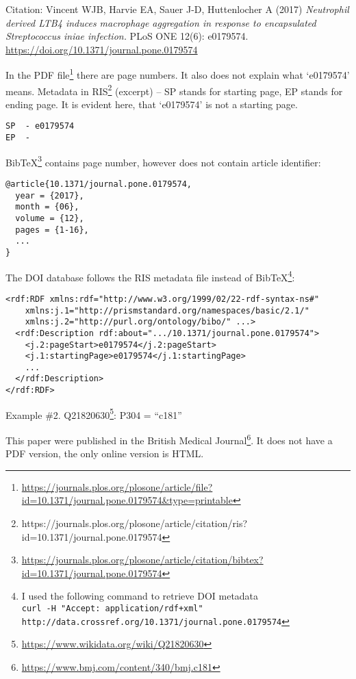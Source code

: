 Citation: Vincent WJB, Harvie EA, Sauer J-D, Huttenlocher A (2017) \emph{Neutrophil derived LTB4 induces macrophage aggregation in response to encapsulated Streptococcus iniae infection.} PLoS ONE 12(6): e0179574. \url{https://doi.org/10.1371/journal.pone.0179574}

In the PDF file\footnote{\url{https://journals.plos.org/plosone/article/file?id=10.1371/journal.pone.0179574&type=printable}} there are page numbers. It also does not explain what `e0179574' means. Metadata in RIS\footnote{https://journals.plos.org/plosone/article/citation/ris?id=10.1371/journal.pone.0179574} (excerpt) -- SP stands for starting page, EP stands for ending page. It is evident here, that `e0179574' is not a starting page. 
\begin{lstlisting}
SP  - e0179574
EP  - 
\end{lstlisting}

BibTeX\footnote{\url{https://journals.plos.org/plosone/article/citation/bibtex?id=10.1371/journal.pone.0179574}} contains page number, however does not contain article identifier:
\begin{lstlisting}
@article{10.1371/journal.pone.0179574,
  year = {2017},
  month = {06},
  volume = {12},
  pages = {1-16},
  ...
}
\end{lstlisting}

The DOI database follows the RIS metadata file instead of BibTeX\footnote{I used the following command to retrieve DOI metadata\\
\texttt{curl -H "Accept: application/rdf+xml" \\ http://data.crossref.org/10.1371/journal.pone.0179574}}:

\begin{lstlisting}
<rdf:RDF xmlns:rdf="http://www.w3.org/1999/02/22-rdf-syntax-ns#"
    xmlns:j.1="http://prismstandard.org/namespaces/basic/2.1/"
    xmlns:j.2="http://purl.org/ontology/bibo/" ...>
  <rdf:Description rdf:about=".../10.1371/journal.pone.0179574">
    <j.2:pageStart>e0179574</j.2:pageStart>
    <j.1:startingPage>e0179574</j.1:startingPage>
    ...
  </rdf:Description>
</rdf:RDF>
\end{lstlisting}

Example \#2. Q21820630\footnote{\url{https://www.wikidata.org/wiki/Q21820630}}: P304 = ``c181''

This paper were published in the British Medical Journal\footnote{\url{https://www.bmj.com/content/340/bmj.c181}}. It does not have a PDF version, the only online version is HTML.

